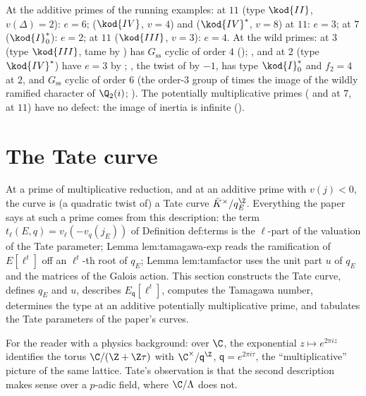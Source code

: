 \begin{example}\label{ex:reduction:defects}
At the additive primes of the running examples:  at $11$ (type $\kod{II}$, $v(\Delta)=2$): $e=6$; 
($\kod{IV}$, $v=4$) and  ($\kod{IV}^*$, $v=8$) at $11$: $e=3$;  at $7$ ($\kod{I}_0^*$): $e=2$; 
at $11$ ($\kod{III}$, $v=3$): $e=4$. At the wild primes:  at $3$ (type $\kod{III}$, tame by
) has $G_{\mathrm{ss}}$ cyclic of order $4$ ();
,  and  at $2$ (type $\kod{IV}^*$) have $e=3$ by ;
, the twist of  by $-1$, has type $\kod{I}_0^*$ and $f_2=4$ at $2$, and $G_{\mathrm{ss}}$ cyclic of order $6$
(the order-$3$ group of  times the image of the wildly ramified character of $\Q_2(i)$;
). The potentially multiplicative primes ( and  at $7$, 
at $11$) have no defect: the image of inertia is infinite ().
\end{example}

\section{The Tate curve}\label{sec:reduction:tate}

At a prime of multiplicative reduction, and at an additive prime with $v(j)<0$, the curve is (a quadratic twist of)
a Tate curve $\bar K^\times/q_E^{\Z}$. Everything the paper says at such a prime comes from this description: the term
$t_\ell(E,q)=v_\ell(-v_q(j_E))$ of Definition def:terms is the $\ell$-part of the valuation of the Tate parameter; Lemma
lem:tamagawa-exp reads the ramification of $E[\ell^t]$ off an $\ell^t$-th root of $q_E$; Lemma lem:tamfactor uses the
unit part $u$ of $q_E$ and the matrices of the Galois action. This section constructs the Tate curve, defines $q_E$
and $u$, describes $E_{\mathsf q}[\ell^t]$, computes the Tamagawa number, determines the type at an additive
potentially multiplicative prime, and tabulates the Tate parameters of the paper's curves.

For the reader with a physics background: over $\C$, the exponential $z\mapsto e^{2\pi iz}$ identifies the torus
$\C/(\Z+\Z\tau)$ with $\C^\times/\mathsf q^{\Z}$, $\mathsf q=e^{2\pi i\tau}$, the ``multiplicative'' picture of the same lattice. Tate's
observation is that the second description makes sense over a $p$-adic field, where $\C/\Lambda$ does not.

